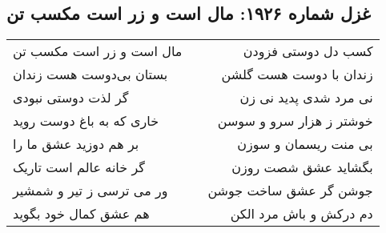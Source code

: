 \begin{center}
\section*{غزل شماره ۱۹۲۶: مال است و زر است مکسب تن}
\label{sec:1926}
\begin{longtable}{l p{0.5cm} r}
مال است و زر است مکسب تن
&&
کسب دل دوستی فزودن
\\
بستان بی‌دوست هست زندان
&&
زندان با دوست هست گلشن
\\
گر لذت دوستی نبودی
&&
نی مرد شدی پدید نی زن
\\
خاری که به باغ دوست روید
&&
خوشتر ز هزار سرو و سوسن
\\
بر هم دوزید عشق ما را
&&
بی منت ریسمان و سوزن
\\
گر خانه عالم است تاریک
&&
بگشاید عشق شصت روزن
\\
ور می ترسی ز تیر و شمشیر
&&
جوشن گر عشق ساخت جوشن
\\
هم عشق کمال خود بگوید
&&
دم درکش و باش مرد الکن
\\
\end{longtable}
\end{center}
